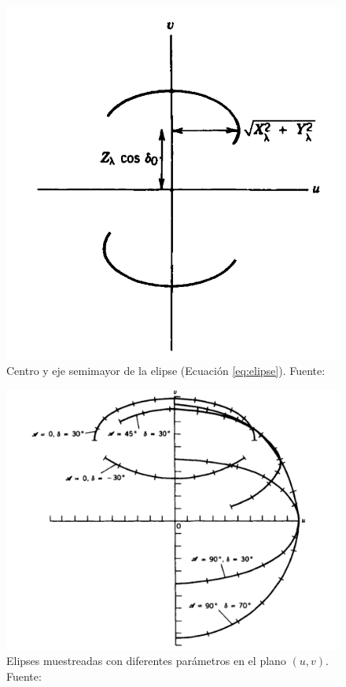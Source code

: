 \begin{figure}[h!]
\centering
\includegraphics[scale=0.3]{images/uvplane1.png}
\caption{Centro y eje semimayor de la elipse (Ecuación \ref{eq:elipse}). Fuente: \citep{libroAstro}}
\label{fig:uvplane1}
\end{figure}

\begin{figure}[h!]
\centering
\includegraphics[scale=0.3]{images/uvplane2.png}
\caption{Elipses muestreadas con diferentes parámetros en el plano $(u,v)$. Fuente: \citep{libroAstro}}
\label{fig:uvplane2}
\end{figure}



